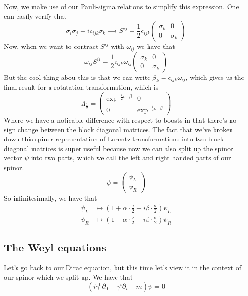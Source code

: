 \documentclass[11pt, oneside]{article}   	%
\theoremstyle{newline}
\theoremstyle{newline}
\theoremstyle{newline}
\theoremstyle{newline}
\theoremstyle{newline}
\begin{document}
Now, we make use of our Pauli-sigma relations to simplify this expression. One can easily verify that \[ \sigma_i \sigma_j = i \epsilon_{ ijk} \sigma_k  \implies S^{ ij } = \frac{1}{ 2} \epsilon_{ ijk} \begin{pmatrix} \sigma_k & 0 \\ 0 & \sigma_k \end{pmatrix} \]
Now, when we want to contract $S^{ ij }$ with $\omega_{ ij } $ we have that 
\[ 
\omega_{ ij} S^{ ij } = \frac{1}{ 2} \epsilon_{ ijk } \omega_{ ij} \begin{pmatrix} \sigma_k & 0 \\ 0 & \sigma_k \end{pmatrix} \]
But the cool thing abou this is that we can write $\beta_k = \epsilon_{ ijk} \omega_{ij }  $, which gives us the final result for a rotatation transformation, which is 
\[ \Lambda_{\frac{ 1}{ 2} }  = \begin{pmatrix}  \exp^{ - \frac{i}{2} \sigma \cdot \beta } & 0 \\ 0 & \exp^{ - \frac{ i}{ 2} \sigma \cdot \beta } \end{pmatrix} \] 
Where we have a noticable difference with respect to boosts in that there's no sign change between the block diagonal matrices. The fact that we've broken down this spinor representation of Lorentz transformations into two block diagonal matrices is super useful because now we can also split up the spinor vector $ \psi $ into two parts, which we call the left and right handed parts of our spinor. 
\[ \psi = \begin{pmatrix} \psi_L \\ \psi_R \end{pmatrix} \] 
So infinitesimally, we have that \begin{align*} 
\psi_L & \mapsto \left( 1 + \alpha \cdot \frac{ \sigma}{2}  - i  \beta \cdot \frac{\sigma}{2} \right)  \psi_L \\ 
\psi_R & \mapsto \left(  1  -  \alpha \cdot \frac{\sigma}{2}  - i \beta \cdot \frac{\sigma}{ 2} \right)  \psi_R 
\end{align*} 

\subsection{The Weyl equations} 
Let's go back to our Dirac equation, but this time let's view it in the context of our spinor which we split up. We have that \[ 
\left( i \gamma^0 \partial_0 - \gamma^i \partial_i - m  \right) \psi  = 0 \] 
\end{document}
